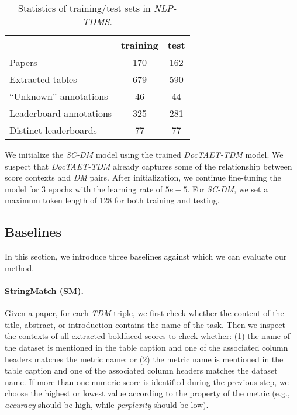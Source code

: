 \documentclass[11pt,a4paper]{article}
\begin{document}
\begin{table}[t]
\begin{center}
\begin{tabular}{@{}lcc@{}}
&training&test\\ \hline
Papers   &170&162\\ Extracted tables   &679&590\\ ``Unknown'' annotations &46&44\\ \hline
Leaderboard annotations &  325&281\\
\enspace\enspace Distinct leaderboards& 77&77\\
 \hline
\end{tabular}
\end{center}
\caption{\label{tab:exp1stat}  Statistics of training/test sets in \emph{NLP-TDMS}.}
\end{table}

We initialize the \emph{SC-DM} model using the trained \emph{DocTAET-TDM} model.
We suspect that 
\emph{DocTAET-TDM} already captures some of the relationship between score contexts and \emph{DM} pairs. After initialization, we continue
fine-tuning the model for 3 epochs with the learning rate of $5e-5$.
For \emph{SC-DM}, we set a maximum token length of 128 for both training and testing.

\subsection{Baselines}\label{sec:baselines}
In this section, we introduce three baselines against which we can evaluate our method. 

\paragraph{StringMatch (SM).} 
Given a paper, for
each \emph{TDM} triple, we first check whether the content of the title, abstract, or introduction contains the name of the task. Then we inspect the contexts of all extracted boldfaced scores to check whether: (1) the name of the dataset is mentioned in the table caption and one of the associated column headers matches the metric name; or (2) the metric name is mentioned in the table caption and one of the associated column headers matches the dataset name. If more than one numeric score is identified during the previous step, we choose the highest or lowest value according to the property of the metric (e.g., \emph{accuracy} should be high, while \emph{perplexity} should be low).
\end{document}

